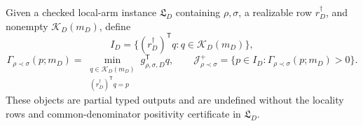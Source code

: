 Given a checked local-arm instance \(\mathfrak L_D\) containing \(\rho,\sigma\), a realizable row \(r_D^\dagger\), and nonempty \(\mathcal K_D(m_D)\), define
\[
I_D=\{(r_D^\dagger)^{\mathsf T}q:q\in\mathcal K_D(m_D)\},
\]
\[
\Gamma_{\rho\prec\sigma}(p;m_D)=
\min_{\substack{q\in\mathcal K_D(m_D)\\(r_D^\dagger)^{\mathsf T}q=p}}
g_{\rho,\sigma,D}^{\mathsf T}q,\qquad
\mathcal J_{\rho\prec\sigma}^{+}
=\{p\in I_D:\Gamma_{\rho\prec\sigma}(p;m_D)>0\}.
\]
These objects are partial typed outputs and are undefined without the locality rows and common-denominator positivity certificate in \(\mathfrak L_D\).